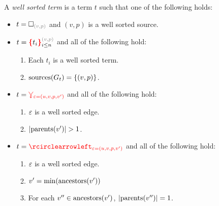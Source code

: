 \begin{definition}
  A \emph{well sorted term} is a term $t$ such that one of the following holds:
  \begin{itemize}

    \item $t = \emptyHole{v}{p}$ and $(v, p)$ is a well sorted source.

    \item $t = \conflictHole[i \leq n]{t_i}{v}{p}$ and all of the following hold:
      \begin{enumerate}
        \item Each $t_i$ is a well sorted term.
        \item $\text{sources}\mathopen{}\left(G_t\right)\mathclose{} = \left\{(v, p)\right\}$.
      \end{enumerate}

    \item $t = \textcolor{red}{\curlyveedownarrow_{\varepsilon{=}(u, v, p, v')}}$ and all of the following hold:
      \begin{enumerate}
        \item $\varepsilon$ is a well sorted edge.
        \item $\left\lvert\operatorname{\text{parents}}\mathopen{}\left(v'\right)\mathclose{}\right\rvert > 1$.
      \end{enumerate}

    \item $t = \cycleVertex{\e{=}(u, v, p, v')}$ and all of the following hold:
      \begin{enumerate}
        \item $\varepsilon$ is a well sorted edge.
        \item $v' = \operatorname{\text{min}}\mathopen{}\left(\operatorname{\text{ancestors}}\mathopen{}\left(v'\right)\mathclose{}\right)\mathclose{}$
        \item For each $v'' \in \operatorname{\text{ancestors}}\mathopen{}\left(v'\right)\mathclose{}$, $\left\lvert\operatorname{\text{parents}}\mathopen{}\left(v''\right)\mathclose{}\right\rvert = 1$.
      \end{enumerate}


\end{itemize}
\end{definition}
